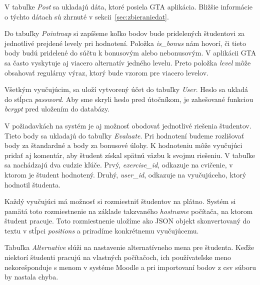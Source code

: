 V tabuľke \textit{Post} sa ukladajú dáta, ktoré posiela GTA aplikácia. Bližšie
informácie o týchto dátach sú zhrnuté v sekcii~\ref{sec:zbieraniedat}.

Do tabuľky \textit{Pointmap} si zapíšeme koľko bodov bude pridelených študentovi
za jednotlivé prejdené levely pri hodnotení. Položka \textit{is\_bonus} nám hovorí,
či tieto body budú pridelené do súčtu k bonusovým alebo nebonusovým. V aplikácii
GTA sa často vyskytuje aj viacero alternatív jedného levelu. Preto položka
\textit{level} môže obsahovať regulárny výraz, ktorý bude vzorom pre viacero
levelov.

Všetkým vyučujúcim, sa uloží vytvorený účet do tabuľky \textit{User}.
Heslo sa ukladá do stĺpca \textit{password}. Aby sme skryli heslo pred útočníkom,
je zahešované funkciou \textit{bcrypt} pred uložením do databázy.

V požiadavkách na systém je aj možnosť obodovať jednotlivé riešenia študentov.
Tieto body sa ukladajú do tabuľky \textit{Evaluate}. Pri hodnotení budeme rozlišovať
body za štandardné a body za bonusové úlohy. K hodnoteniu môže vyučujúci pridať aj
komentár, aby študent získal spätnú väzbu k svojmu riešeniu. V tabuľke sa nachádzajú
dva cudzie kľúče. Prvý, \textit{exercise\_id}, odkazuje na cvičenie, v ktorom je študent
hodnotený. Druhý, \textit{user\_id}, odkazuje na vyučujúceho, ktorý hodnotil študenta.

Každý vyučujúci má možnosť si rozmiestniť študentov na plátno. Systém si
pamätá toto rozmiestnenie na základe takzvaného \textit{hostname} počítača,
na ktorom študent pracuje. Toto rozmiestnenie uložíme ako JSON objekt skonvertovaný
do textu v stĺpci \textit{positions} a priradíme konkrétnemu vyučujúcemu.

Tabuľka \textit{Alternative} slúži na nastavenie alternatívneho mena pre študenta.
Keďže niektorí študenti pracujú na vlastných počítačoch, ich používateľske meno
nekorešponduje s menom v systéme Moodle a pri importovaní bodov z csv súboru
by nastala chyba.

